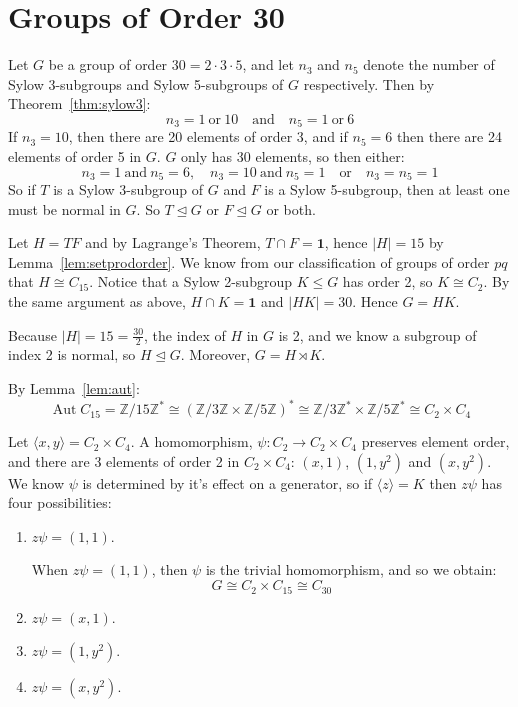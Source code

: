 \documentclass[a4paper, oneside, 12pt, final]{article}
\theoremstyle{definition}
\DeclareMathOperator{\Aut}{Aut}
\newcommand{\Z}{\mathbb{Z}}
\newcommand{\Zn}[1]{\Z/#1\Z}
\begin{document}
\section{Groups of Order 30}
Let \(G\) be a group of order \(30 = 2 \cdot 3 \cdot 5\), and let \(n_3\) and \(n_5\) denote the number of Sylow
3-subgroups and Sylow 5-subgroups of \(G\) respectively.
Then by Theorem~\ref{thm:sylow3}:
\[n_3 = 1 \ \text{or} \ 10 \quad \text{and} \quad n_5 = 1 \ \text{or} \ 6\]
If \(n_3 = 10\), then there are 20 elements of order 3, and if \(n_5 = 6\) then
there are 24 elements of order 5 in \(G\).
\(G\) only has 30 elements, so then either:
\[n_3 = 1 \ \text{and} \ n_5 = 6, \quad n_3 = 10 \ \text{and} \ n_5 = 1 \quad \text{or} \quad n_3 = n_5 = 1\]
So if \(T\) is a Sylow 3-subgroup of \(G\) and \(F\) is a Sylow 5-subgroup, then at least one must be normal in \(G\).
So \(T \unlhd G\) or \(F \unlhd G\) or both.

Let \(H = TF\) and by Lagrange's Theorem, \(T \cap F = \bm{1}\), hence \(|H| = 15\) by Lemma~\ref{lem:setprodorder}.
We know from our classification of groups of order \(pq\) that \(H \cong C_{15}\).
Notice that a Sylow 2-subgroup \(K \leqslant G\) has order 2, so \(K \cong C_2\).
By the same argument as above, \(H \cap K = \bm{1}\) and \(|HK| = 30\).
Hence \(G = HK\).

Because \(|H| = 15 = \frac{30}{2}\), the index of \(H\) in \(G\) is 2, and we know a subgroup of index 2 is normal, so \(H \unlhd G\).
Moreover, \(G = H \rtimes K\).

By Lemma~\ref{lem:aut}:
\[\Aut{C_{15}} = \Zn{15}^* \cong {(\Zn{3} \times \Zn{5})}^* \cong \Zn{3}^* \times \Zn{5}^* \cong C_2 \times C_4\]

Let \(\langle x, y \rangle = C_2 \times C_4\).
A homomorphism, \(\psi:C_2 \to C_2 \times C_4\) preserves element order, and there are 3 elements of order 2 in \(C_2
\times C_4\): \((x, 1)\), \((1, y^2)\) and \((x, y^2)\).
We know \(\psi\) is determined by it's effect on a generator, so if \(\langle z \rangle = K\) then \(z\psi\) has four
possibilities:

\begin{enumerate}
    \item \(z\psi = (1, 1)\).

        When \(z\psi = (1, 1)\), then \(\psi\) is the trivial homomorphism, and
        so we obtain:
        \[G \cong C_2 \times C_{15} \cong C_{30}\]

    \item \(z\psi = (x, 1)\).
    \item \(z\psi = (1, y^2)\).
    \item \(z\psi = (x, y^2)\).
\end{enumerate}
\end{document}
